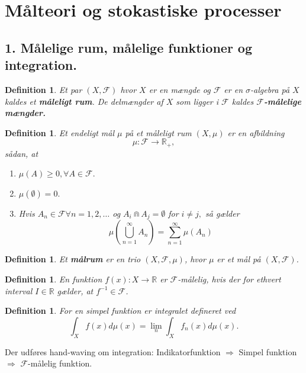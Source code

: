 \documentclass[12pt]{report}
\newtheorem{definition}[lemma]{Definition}
\theoremstyle{break}
\theoremstyle{break}
\newcommand{\RR}{\mathbb{R}}
\newcommand{\FI}{\mathcal{F}}
\begin{document}
\chapter*{Målteori og stokastiske processer}
\section*{1. Målelige rum, målelige funktioner og integration.}
\begin{definition}
	Et par $(X,\FI)$ hvor $X$ er en mængde og $\FI$ er en $\sigma$-algebra på $X$ kaldes et {\bf måleligt rum}. De delmængder af $X$ som ligger i $\FI$ kaldes  {\bf $\FI$-målelige mængder.}
\end{definition}
\begin{definition}
	Et endeligt mål $\mu$ på et måleligt rum $(X,\mu)$ er en afbildning
	\[\mu \colon \FI \to \RR_+, \]
	sådan, at
	\begin{enumerate}
		\item $ \mu (A) \geq 0, \forall A \in \FI .$
		\item $ \mu(\emptyset)=0. $
		\item Hvis $A_n \in \FI \forall n=1,2,\dots$ og $A_i \Cap A_j = \emptyset$ for $i\neq j,$ så gælder
		\[ \mu \left( \bigcup^\infty_{n=1}A_n \right)=\sum\limits_{n=1}^{\infty}\mu \left( A_n \right) \]
	\end{enumerate}
\end{definition}
\begin{definition}
	Et {\bf målrum} er en trio $(X,\FI,\mu)$, hvor $\mu$ er et mål på $(X,\FI)$.
\end{definition}
\begin{definition}
	En funktion $f(x) \colon X\to \RR$ er $\FI$-målelig, hvis der for ethvert interval $I\in \RR$ gælder, at $f^{-1}\in \FI$.
\end{definition}
\begin{definition}
	For en simpel funktion er integralet defineret ved
	\[ \int_{X} f(x)d\mu(x)=\lim\limits_{n} \int_{X}f_n(x)d\mu(x).\]
\end{definition}

Der udføres hand-waving om integration: Indikatorfunktion $\Rightarrow$ Simpel funktion $\Rightarrow$ $\FI$-målelig funktion.
\end{document}
